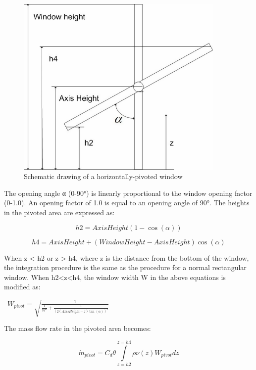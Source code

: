 \begin{figure}[hbtp] %
\centering
\includegraphics[width=0.9\textwidth, height=0.9\textheight, keepaspectratio=true]{media/image2703.png}
\caption{Schematic drawing of a horizontally-pivoted window \protect \label{fig:schematic-drawing-of-a-horizontally-pivoted}}
\end{figure}

The opening angle α (0-90°) is linearly proportional to the window opening factor (0-1.0). An opening factor of 1.0 is equal to an opening angle of 90°. The heights in the pivoted area are expressed as:

\begin{equation}
h2 = AxisHeight(1 - \cos (\alpha ))
\end{equation}

\begin{equation}
h4 = AxisHeight + (WindowHeight - AxisHeight)\cos (\alpha )
\end{equation}

When z \textless{} h2 or z \textgreater{} h4, where z is the distance from the bottom of the window, the integration procedure is the same as the procedure for a normal rectangular window. When h2\textless{}z\textless{}h4, the window width W in the above equations is modified as:

~\({W_{pivot}} = \sqrt {\frac{1}{{\frac{1}{{{W^2}}} + \frac{1}{{{{(2(AxisHeight - z)\tan (\alpha ))}^2}}}}}}\)

The mass flow rate in the pivoted area becomes:

\begin{equation}
{\dot m_{pivot}} = {C_d}\theta \int\limits_{z = h2}^{z = h4} {\rho \nu (z){W_{pivot}}dz}
\end{equation}

